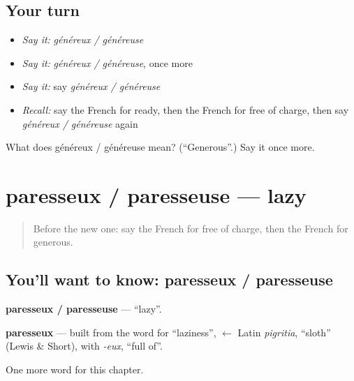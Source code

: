 \subsection*{Your turn}
\begin{itemize}
\raggedright
  \item \emph{Say it:} \emph{généreux / généreuse}
  \item \emph{Say it:} \emph{généreux / généreuse}, once more
  \item \emph{Say it:} say \emph{généreux / généreuse}
  \item \emph{Recall:} say the French for ready, then the French for free of charge, then say \emph{généreux / généreuse} again
\end{itemize}

\begin{tcolorbox}[breakable,colback=teal!4,colframe=teal!35!black,title={Before you move on}]
What does généreux / généreuse mean? (\textquotedblleft{}Generous\textquotedblright{}.) Say it once more.
\end{tcolorbox}
\section[paresseux / paresseuse]{paresseux / paresseuse — lazy}

\label{lesson:FR-C246-paresseux-paresseuse}



\begin{quote}
Before the new one: say the French for free of charge, then the French for generous.
\end{quote}

\subsection*{You'll want to know: paresseux / paresseuse}
\textbf{paresseux / paresseuse} — \textquotedblleft{}lazy\textquotedblright{}.

\begin{cousinweb}
\textbf{paresseux} — built from the word for \textquotedblleft{}laziness\textquotedblright{}, $\leftarrow$ Latin \emph{pigritia}, \textquotedblleft{}sloth\textquotedblright{} (Lewis \& Short), with \emph{-eux}, \textquotedblleft{}full of\textquotedblright{}.
\end{cousinweb}

\begin{grammarlens}[title={What you've built}]
One more word for this chapter.
\end{grammarlens}

